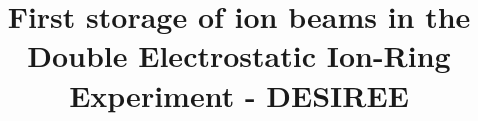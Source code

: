 \documentclass[aps,pra,preprint,superscriptaddress]{revtex4}
\begin{document}

\title{First storage of ion beams in the Double Electrostatic Ion-Ring Experiment - DESIREE}
\end{document}
